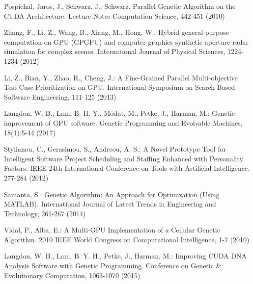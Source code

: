 \begin{thebibliography}{}
Pospichal, Jaros, J., Schwarz, J.:
Schwarz. Parallel Genetic Algorithm on the CUDA Architecture.
Lecture Notes Computation Science, 442-451 (2010)

Zhang, F., Li, Z., Wang, B., Xiang, M., Hong, W.:
Hybrid general-purpose computation on GPU (GPGPU) and computer graphics synthetic aperture radar simulation for complex scenes.
International Journal of Physical Sciences, 1224-1234 (2012)

Li, Z., Bian, Y., Zhao, R., Cheng, J.:
A Fine-Grained Parallel Multi-objective Test Case Prioritization on GPU.
International Symposium on Search Based Software Engineering, 111-125 (2013)

Langdon, W. B., Lam, B. H. Y., Modat, M., Petke, J., Harman, M.:
Genetic improvement of GPU software.
Genetic Programming and Evolvable Machines, 18(1):5-44 (2017)

Stylianou, C., Gerasimou, S., Andreou, A. S.:
A Novel Prototype Tool for Intelligent Software 
Project Scheduling and Staffing Enhanced with Personality Factors.
IEEE 24th International Conference on Tools with Artificial Intelligence. 277-284 (2012)

Samanta, S.:
Genetic Algorithm: An Approach for Optimization (Using MATLAB). 
International Journal of Latest Trends in Engineering and Technology, 261-267 (2014)

Vidal, P., Alba, E.:
A Multi-GPU Implementation of a Cellular Genetic Algorithm.
2010 IEEE World Congress on Computational Intelligence, 1-7 (2010)

Langdon, W. B., Lam, B. Y. H., Petke, J., Harman, M.:
Improving CUDA DNA Analysis Software with Genetic Programming.
Conference on Genetic \& Evolutionary Computation, 1063-1070 (2015)
























\end{thebibliography}
